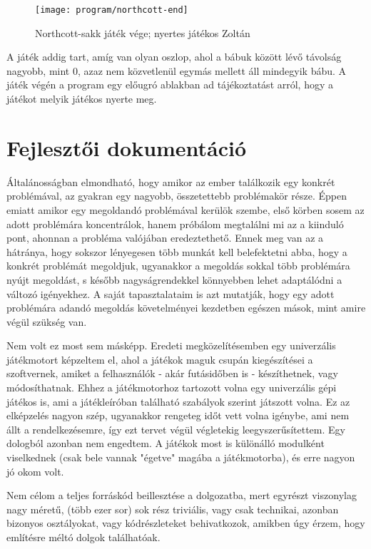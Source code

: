 \begin{figure}[!ht]
	\texttt{[image: program/northcott-end]}
	\centering
	\caption{Northcott-sakk játék vége; nyertes játékos Zoltán}
	\label{fig:northcott-end}
\end{figure}

A játék addig tart, amíg van olyan oszlop, ahol a bábuk között lévő távolság nagyobb, mint 0, azaz nem közvetlenül egymás mellett áll mindegyik bábu. A játék végén a program egy előugró ablakban ad tájékoztatást arról, hogy a játékot melyik játékos nyerte meg.


\section{Fejlesztői dokumentáció}

Általánosságban elmondható, hogy amikor az ember találkozik egy konkrét problémával, az gyakran egy nagyobb, összetettebb problémakör része. Éppen emiatt amikor egy megoldandó problémával kerülök szembe, első körben sosem az adott problémára koncentrálok, hanem próbálom megtalálni mi az a kiinduló pont, ahonnan a probléma valójában eredeztethető. Ennek meg van az a hátránya, hogy sokszor lényegesen több munkát kell belefektetni abba, hogy a konkrét problémát megoldjuk, ugyanakkor a megoldás sokkal több problémára nyújt megoldást, s később nagyságrendekkel könnyebben lehet adaptálódni a változó igényekhez. A saját tapasztalataim is azt mutatják, hogy egy adott problémára adandó megoldás követelményei kezdetben egészen mások, mint amire végül szükség van.\ujsor

Nem volt ez most sem másképp. Eredeti megközelítésemben egy univerzális játékmotort képzeltem el, ahol a játékok maguk csupán kiegészítései a szoftvernek, amiket a felhasználók - akár futásidőben is - készíthetnek, vagy módosíthatnak. Ehhez a játékmotorhoz tartozott volna egy univerzális gépi játékos is, ami a játékleíróban található szabályok szerint játszott volna. Ez az elképzelés nagyon szép, ugyanakkor rengeteg időt vett volna igénybe, ami nem állt a rendelkezésemre, így ezt tervet végül végletekig leegyszerűsítettem. Egy dologból azonban nem engedtem. A játékok most is különálló modulként viselkednek (csak bele vannak "égetve" magába a játékmotorba), és erre nagyon jó okom volt.\ujsor

Nem célom a teljes forráskód beillesztése a dolgozatba, mert egyrészt viszonylag nagy méretű, (több ezer sor) sok rész triviális, vagy csak technikai, azonban bizonyos osztályokat, vagy kódrészleteket behivatkozok, amikben úgy érzem, hogy említésre méltó dolgok találhatóak.


